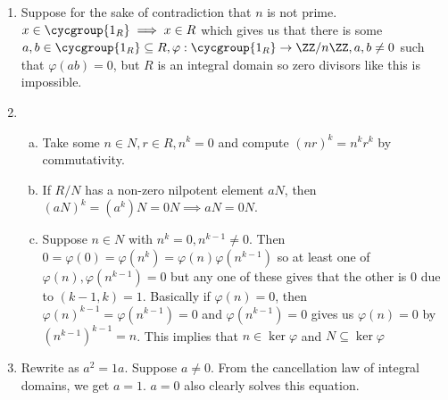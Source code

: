 \documentclass{article}
\begin{document}
\begin{enumerate}

\item
Suppose for the sake of contradiction that $n$ is not prime.
$x \in \cycgroup{1_R} \implies x \in R$ which gives us that there is
some $a, b \in \cycgroup{1_R} \subseteq R, \varphi : \cycgroup{1_R} \to
\ZZ / n \ZZ, a, b \neq 0$ such that $\varphi(ab) = 0$, but $R$ is an
integral domain so zero divisors like this is impossible.

\item
\begin{enumerate}[(a)]
\item
Take some $n \in N, r \in R, n^k = 0$ and compute $(nr)^k = n^k r^k$ by
commutativity.

\item
If $R / N$ has a non-zero nilpotent element $aN$, then $(aN)^k = (a^k)N
= 0N \implies aN = 0N$.

\item
Suppose $n \in N$ with $n^k = 0, n^{k - 1} \neq 0$. Then $0 = \varphi(0)
= \varphi(n^k) = \varphi(n) \varphi(n^{k - 1})$ so at least one of
$\varphi(n), \varphi(n^{k - 1}) = 0$ but any one of these gives that the
other is $0$ due to $(k - 1, k) = 1$. Basically if $\varphi(n) = 0$,
then $\varphi(n)^{k - 1} = \varphi(n^{k - 1}) = 0$ and $\varphi(n^{k -
1}) = 0$ gives us $\varphi(n) = 0$ by $\left(n^{k - 1}\right)^{k - 1} =
n$. This implies that $n \in \ker \varphi$ and $N \subseteq \ker
\varphi$
\end{enumerate}

\item
Rewrite as $a^2 = 1a$. Suppose $a \neq 0$. From the cancellation law of
integral domains, we get $a = 1$. $a = 0$ also clearly solves this
equation.

\end{enumerate}
\end{document}
